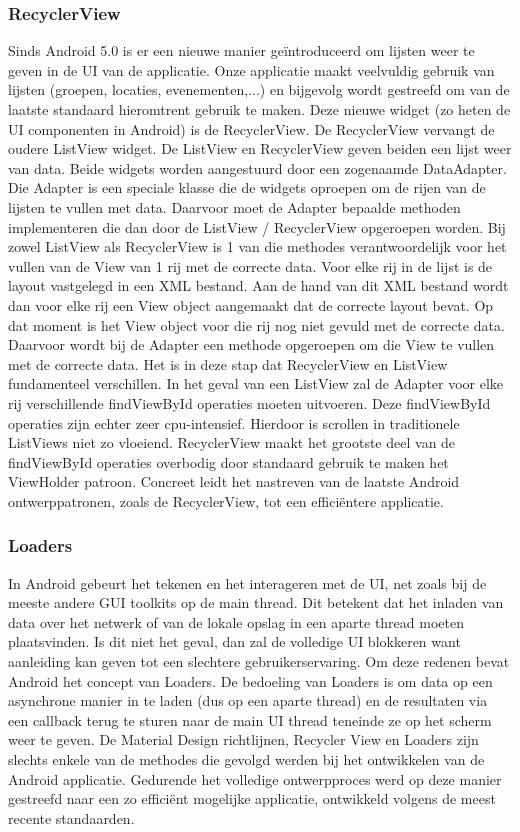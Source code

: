 \subsubsection{RecyclerView}
Sinds Android 5.0 is er een nieuwe manier geïntroduceerd om lijsten weer te geven in de UI van de applicatie. Onze applicatie maakt veelvuldig gebruik van lijsten (groepen, locaties, evenementen,...) en bijgevolg wordt gestreefd om van de laatste standaard hieromtrent gebruik te maken. Deze nieuwe widget (zo heten de UI componenten in Android) is de RecyclerView. De RecyclerView vervangt de oudere ListView widget.
De ListView en RecyclerView geven beiden een lijst weer van data. Beide widgets worden aangestuurd door een zogenaamde DataAdapter. Die Adapter is een speciale klasse die de widgets oproepen om de rijen van de lijsten te vullen met data. Daarvoor moet de Adapter bepaalde methoden implementeren die dan door de ListView / RecyclerView opgeroepen worden. Bij zowel ListView als RecyclerView is 1 van die methodes verantwoordelijk voor het vullen van de View van 1 rij met de correcte data.
Voor elke rij in de lijst is de layout vastgelegd in een XML bestand. Aan de hand van dit XML bestand wordt dan voor elke rij een View object aangemaakt dat de correcte layout bevat. Op dat moment is het View object voor die rij nog niet gevuld met de correcte data. Daarvoor wordt bij de Adapter een methode opgeroepen om die View te vullen met de correcte data.
Het is in deze stap dat RecyclerView en ListView fundamenteel verschillen. In het geval van een ListView zal de Adapter voor elke rij verschillende findViewById operaties moeten uitvoeren. Deze findViewById operaties zijn echter zeer cpu-intensief. Hierdoor is scrollen in traditionele ListViews niet zo vloeiend.
RecyclerView maakt het grootste deel van de findViewById operaties overbodig door standaard gebruik te maken het ViewHolder patroon.
Concreet leidt het nastreven van de laatste Android ontwerppatronen, zoals de RecyclerView, tot een efficiëntere applicatie.

\subsubsection{Loaders}
In Android gebeurt het tekenen en het interageren met de UI, net zoals bij de meeste andere GUI toolkits op de main thread. Dit betekent dat het inladen van data over het netwerk of van de lokale opslag in een aparte thread moeten plaatsvinden. Is dit niet het geval, dan zal de volledige UI blokkeren want aanleiding kan geven tot een slechtere gebruikerservaring.
Om deze redenen bevat Android het concept van Loaders. De bedoeling van Loaders is om data op een asynchrone manier in te laden (dus op een aparte thread) en de resultaten via een callback terug te sturen naar de main UI thread teneinde ze op het scherm weer te geven. 
\newline\newline
De Material Design richtlijnen, Recycler View en Loaders zijn slechts enkele van de methodes die gevolgd werden bij het ontwikkelen van de Android applicatie. Gedurende het volledige ontwerpproces werd op deze manier gestreefd naar een zo efficiënt mogelijke applicatie, ontwikkeld volgens de meest recente standaarden. \cite{successapp}
